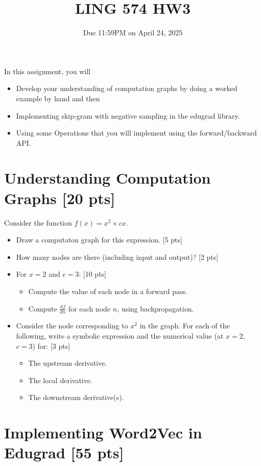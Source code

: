 \documentclass[11pt]{article}
\begin{document}
\title{LING 574 HW3}
\date{\vspace{-0.2in}Due 11:59PM on April 24, 2025}
\maketitle


\noindent In this assignment, you will 
\begin{itemize}
  \item Develop your understanding of computation graphs by doing a worked example by hand and then
  \item Implementing skip-gram with negative sampling in the edugrad library.
  \item Using some Operations that you will implement using the forward/backward API.
\end{itemize}


\section{Understanding Computation Graphs [20 pts]}

  Consider the function $f(x) = x^2 \times cx$.
\begin{itemize}
  \item Draw a computaton graph for this expression. [5 pts]
  \item How many nodes are there (including input and output)? [2 pts]
  \item For $x = 2$ and $c=3$: [10 pts]
    \begin{itemize}
      \item Compute the value of each node in a forward pass.
      \item Compute $\frac{df}{dn}$ for each node $n$, using backpropagation.
    \end{itemize}
  \item Consider the node corresponding to $x^2$ in the graph.  For each of the following, write a symbolic expression and the numerical value (at $x=2$, $c=3$) for: [3 pts]
    \begin{itemize}
      \item The upstream derivative.
      \item The local derivative.
      \item The downstream derivative(s).
    \end{itemize}
\end{itemize}

\section{Implementing Word2Vec in Edugrad [55 pts]}
\end{document}
